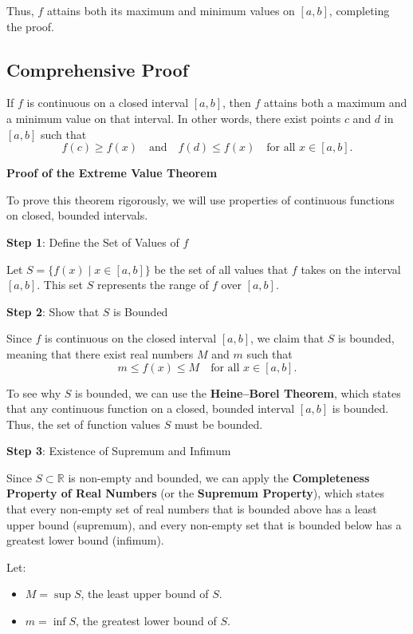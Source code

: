 \documentclass[a4paper,12pt]{book}
\begin{document}
Thus, \( f \) attains both its maximum and minimum values on \([a, b]\), completing the proof.


\subsection{Comprehensive Proof}

If \( f \) is continuous on a closed interval \([a, b]\), then \( f \) attains both a maximum and a minimum value on that interval. In other words, there exist points \( c \) and \( d \) in \([a, b]\) such that
\[
f(c) \geqslant f(x) \quad \text{and} \quad f(d) \leqslant f(x) \quad \text{for all } x \in [a, b].
\]

\textbf{Proof of the Extreme Value Theorem}

To prove this theorem rigorously, we will use properties of continuous functions on closed, bounded intervals.

\textbf{Step 1}: Define the Set of Values of \( f \)

Let \( S = \{ f(x) \mid x \in [a, b] \} \) be the set of all values that \( f \) takes on the interval \([a, b]\). This set \( S \) represents the range of \( f \) over \([a, b]\).

\textbf{Step 2}: Show that \( S \) is Bounded

Since \( f \) is continuous on the closed interval \([a, b]\), we claim that \( S \) is bounded, meaning that there exist real numbers \( M \) and \( m \) such that
\[
m \leqslant f(x) \leqslant M \quad \text{for all } x \in [a, b].
\]

To see why \( S \) is bounded, we can use the \textbf{Heine–Borel Theorem}, which states that any continuous function on a closed, bounded interval \([a, b]\) is bounded. Thus, the set of function values \( S \) must be bounded.

\textbf{Step 3}: Existence of Supremum and Infimum

Since \( S \subset \mathbb{R} \) is non-empty and bounded, we can apply the \textbf{Completeness Property of Real Numbers} (or the \textbf{Supremum Property}), which states that every non-empty set of real numbers that is bounded above has a least upper bound (supremum), and every non-empty set that is bounded below has a greatest lower bound (infimum).

Let:
\begin{itemize}
	\item 
	\( M = \sup S \), the least upper bound of \( S \).
	\item 
	\( m = \inf S \), the greatest lower bound of \( S \).
\end{itemize}
\end{document}
